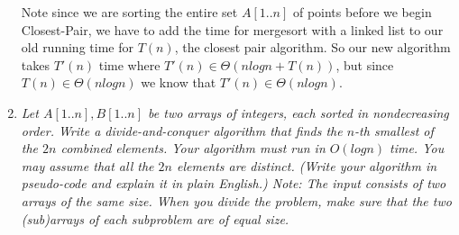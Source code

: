 \documentclass[10pt,oneside,reqno]{amsart}
\theoremstyle{plain}
\theoremstyle{definition}
\theoremstyle{remark}
\begin{document}
\begin{enumerate}[label=\arabic*.]
Note since we are sorting the entire set $A[1..n]$ of points before we begin Closest-Pair, we have to add the time for mergesort with a linked list to our old running time for $T(n)$, the closest pair algorithm. So our new algorithm takes $T'(n)$ time where $T'(n) \in \Theta(nlogn + T(n))$, but since $T(n) \in \Theta(nlogn)$ we know that $T'(n) \in \Theta(nlogn)$. 

\item \textit{Let $A[1..n],B[1..n]$ be two arrays of integers, each sorted in nondecreasing order.  Write a
divide-and-conquer algorithm that finds the $n$-th smallest of the $2n$ combined elements.  Your algorithm must run in $O(logn)$ time.  You may assume that all the $2n$ elements are distinct.
(Write  your  algorithm  in  pseudo-code  and  explain  it  in  plain  English.)
Note: The  input consists of two arrays of the same size.  When you divide the problem, make sure that the
two (sub)arrays of each subproblem are of equal size.}


\end{enumerate}
\end{document}
